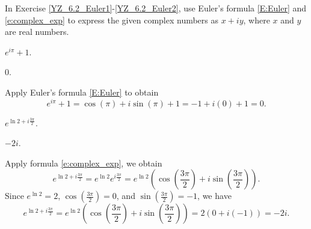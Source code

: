 \documentclass{ximera}
\begin{document}
In Exercise \ref{YZ_6.2_Euler1}-\ref{YZ_6.2_Euler2}, use Euler's formula \eqref{E:Euler} and \eqref{e:complex_exp} to express the given complex numbers as $x+iy$, where $x$ and $y$ are real numbers.
\begin{exercise}\label{YZ_6.2_Euler1}
$e^{i\pi}+ 1$.

\begin{solution}
\ans $0$.

\soln Apply Euler's formula \eqref{E:Euler} to obtain
\[
e^{i\pi} + 1 = \cos(\pi) + i\sin(\pi) + 1 = -1 + i(0) + 1 = 0.
\]
\end{solution}
\end{exercise}

\begin{exercise}\label{YZ_6.2_Euler2}
$e^{\ln 2+i\frac{3\pi}{2}}$.

\begin{solution}
\ans $-2i$.

\soln Apply formula \eqref{e:complex_exp}, we obtain
\[
e^{\ln 2+i\frac{3\pi}{2}}=e^{\ln 2}e^{i\frac{3\pi}{2}}=e^{\ln 2}(\cos(\frac{3\pi}{2})+i\sin(\frac{3\pi}{2})).
\]
Since $e^{\ln 2}=2$, $\cos(\frac{3\pi}{2})=0$, and $\sin(\frac{3\pi}{2})=-1$, we have
\[
e^{\ln 2+i\frac{3\pi}{2}}=e^{\ln 2}(\cos(\frac{3\pi}{2})+i\sin(\frac{3\pi}{2}))=2(0+i(-1))=-2i.
\]
\end{solution}
\end{exercise}
\end{document}
